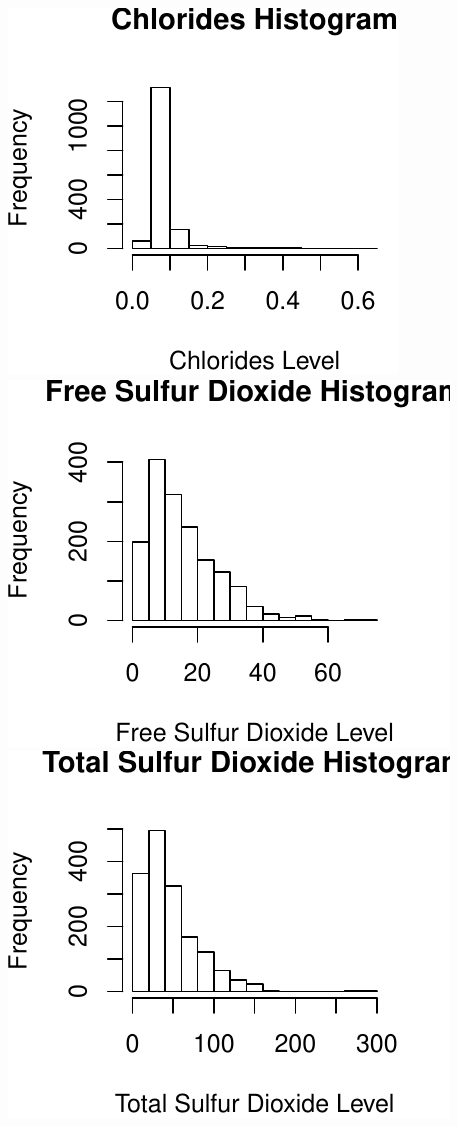 \documentclass[]{article}
\begin{document}
\includegraphics{./Project_files/figure-latex/unnamed-chunk-18-4.pdf}
\includegraphics{./Project_files/figure-latex/unnamed-chunk-18-5.pdf}
\includegraphics{./Project_files/figure-latex/unnamed-chunk-18-6.pdf}
\end{document}
